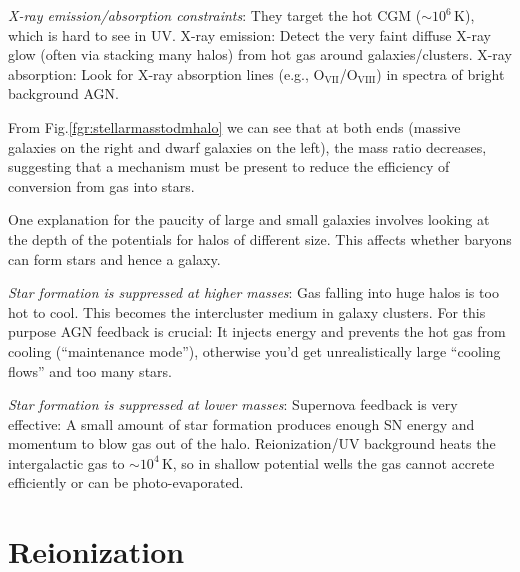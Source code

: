 \par \emph{X-ray emission/absorption constraints}: They target the hot CGM ($\sim 10^{6}\,\text{K}$), which is hard to see in UV. X-ray emission: Detect the very faint diffuse X-ray glow (often via stacking many halos) from hot gas around galaxies/clusters. X-ray absorption: Look for X-ray absorption lines (e.g., $\text{O}_{\text{VII}}$/$\text{O}_{\text{VIII}}$) in spectra of bright background AGN.
\par From Fig.\ref{fgr:stellarmasstodmhalo} we can see that at both ends (massive galaxies on the right and dwarf galaxies on the left), the mass ratio decreases, suggesting that a mechanism must be present to reduce the efficiency of conversion from gas into stars.
\par One explanation for the paucity of large and small galaxies involves looking at the depth of the potentials for halos of different size. This affects whether baryons can form stars and hence a galaxy.
\par \emph{Star formation is suppressed at higher masses}: Gas falling into huge halos is too hot to cool. This becomes the intercluster medium in galaxy clusters. For this purpose AGN feedback is crucial: It injects energy and prevents the hot gas from cooling (“maintenance mode”), otherwise you’d get unrealistically large “cooling flows” and too many stars.
\par \emph{Star formation is suppressed at lower masses}: Supernova feedback is very effective: A small amount of star formation produces enough SN energy and momentum to blow gas out of the halo.
Reionization/UV background heats the intergalactic gas to $\sim 10^{4}\,\text{K}$, so in shallow potential wells the gas cannot accrete efficiently or can be photo-evaporated.

\section{Reionization}


